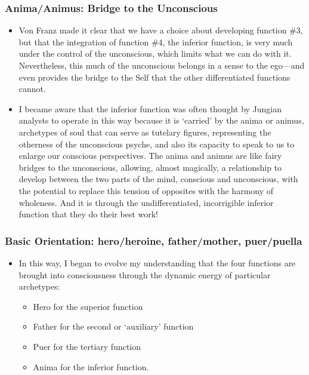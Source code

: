 \subsubsection{Anima/Animus: Bridge to the Unconscious}

\begin{itemize}

\item
Von Franz made it clear that we have a choice about developing function \#3,
but that the integration of function \#4, the inferior function, is very much
under the control of the unconscious, which limits what we can do with it.
Nevertheless, this much of the unconscious belongs in a sense to the ego—and
even provides the bridge to the Self that the other differentiated functions
cannot.

\item
I became aware that the inferior function was often thought by Jungian analysts
to operate in this way because it is ‘carried’ by the anima or animus,
archetypes of soul that can serve as tutelary figures, representing the
otherness of the unconscious psyche, and also its capacity to speak to us to
enlarge our conscious perspectives. The anima and animus are like fairy bridges
to the unconscious, allowing, almost magically, a relationship to develop
between the two parts of the mind, conscious and unconscious, with the
potential to replace this tension of opposites with the harmony of wholeness.
And it is through the undifferentiated, incorrigible inferior function that
they do their best work!
\end{itemize}

\subsubsection{Basic Orientation: hero/heroine, father/mother, puer/puella}

\begin{itemize}

\item In this way, I began to evolve my understanding that the four functions are
brought into consciousness through the dynamic energy of particular archetypes:%
\begin{itemize}
\item Hero for the superior function
\item Father for the second or ‘auxiliary’ function
\item Puer for the tertiary function
\item Anima for the inferior function.
\end{itemize}

\end{itemize}

